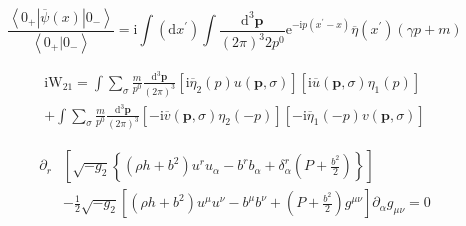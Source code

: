 \documentclass[11pt,a4paper]{book}
\begin{document}
\begin{equation}
    \frac { \left\langle 0 _ { + } | \overline { \psi } ( x ) | 0 _ { - } \right\rangle } { \left\langle 0 _ { + } | 0 _ { - } \right\rangle } = \mathrm { i } \int \left( \mathrm { d } x ^ { \prime } \right) \int \frac { \mathrm { d } ^ { 3 } \mathbf { p } } { ( 2 \pi ) ^ { 3 } 2 p ^ { 0 } } \mathrm { e } ^ { - \mathrm { i } p \left( x ^ { \prime } - x \right) } \overline { \eta } \left( x ^ { \prime } \right) ( \gamma p + m )
\end{equation}

\begin{equation}
    \left. \begin{array} { l } { \mathrm { i } \mathrm { W } _ { 21 } = \int \sum _ { \sigma } \frac { m } { p ^ { 0 } } \frac { \mathrm { d } ^ { 3 } \mathbf { p } } { ( 2 \pi ) ^ { 3 } } \left[ \mathrm { i } \overline { \eta } _ { 2 } ( p ) u ( \mathbf { p } , \sigma ) \right] \left[ \mathrm { i } \overline { u } ( \mathbf { p } , \sigma ) \eta _ { 1 } ( p ) \right] } \\ { + \int \sum _ { \sigma } \frac { m } { p ^ { 0 } } \frac { \mathrm { d } ^ { 3 } \mathbf { p } } { ( 2 \pi ) ^ { 3 } } \left[ - \mathrm { i } \overline { v } ( \mathbf { p } , \sigma ) \eta _ { 2 } ( - p ) \right] \left[ - \mathrm { i } \overline { \eta } _ { 1 } ( - p ) v ( \mathbf { p } , \sigma ) \right] } \end{array} \right.
\end{equation}

\begin{equation}
    \left.\begin{aligned} \partial _ { r } & \left[ \sqrt { - g _ { 2 } } \left\{ \left( \rho h + b ^ { 2 } \right) u ^ { r } u _ { \alpha } - b ^ { r } b _ { \alpha } + \delta _ { \alpha } ^ { r } \left( P + \frac { b ^ { 2 } } { 2 } \right) \right\} \right] \\& - \frac { 1 } { 2 } \sqrt { - g _ { 2 } } \left[ \left( \rho h + b ^ { 2 } \right) u ^ { \mu } u ^ { \nu } - b ^ { \mu } b ^ { \nu } + \left( P + \frac { b ^ { 2 } } { 2 } \right) g ^ { \mu \nu } \right] \partial _ { \alpha } g _ { \mu \nu } = 0 \end{aligned} \right.
\end{equation}
\end{document}
